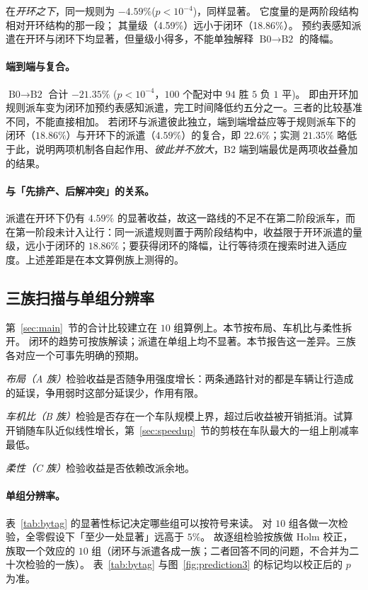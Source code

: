 \documentclass[manuscript,screen,review]{acmart}
\newcommand{\NCases}{10}
\newcommand{\NPairs}{100}
\newcommand{\GainLoopRule}{18.86\%}      %
\newcommand{\GainProbeOpen}{4.59\%}      %
\newcommand{\PProbeOpen}{<10^{-4}}
\newcommand{\GainEndToEnd}{21.35\%}      %
\newcommand{\PEndToEnd}{<10^{-4}}
\newcommand{\WinEndToEnd}{94}
\newcommand{\LoseEndToEnd}{5}
\newcommand{\GainIndepProduct}{22.6\%}
\begin{document}
在\emph{开环之下}，同一规则为 $-\GainProbeOpen$($p\PProbeOpen$)，同样显著。
它度量的是两阶段结构相对开环结构的那一段；
其量级（\GainProbeOpen{}）远小于闭环（\GainLoopRule{}）。
预约表感知派遣在开环与闭环下均显著，但量级小得多，不能单独解释 $\text{B0}\to\text{B2}$ 的降幅。

\paragraph{端到端与复合。}
\label{sec:complement}
$\text{B0}\to\text{B2}$ 合计 $-\GainEndToEnd$
($p\PEndToEnd$，$\NPairs$ 个配对中 $\WinEndToEnd$ 胜 $\LoseEndToEnd$ 负 $1$ 平)。
即由开环加规则派车变为闭环加预约表感知派遣，完工时间降低约五分之一。三者的比较基准不同，不能直接相加。
若闭环与派遣彼此独立，端到端增益应等于规则派车下的闭环（$\GainLoopRule$）与开环下的派遣（$\GainProbeOpen$）的复合，即 $\GainIndepProduct$；实测 $\GainEndToEnd$ 略低于此，说明两项机制各自起作用、\emph{彼此并不放大}，B2 端到端最优是两项收益叠加的结果。

\paragraph{与「先排产、后解冲突」的关系。}
派遣在开环下仍有 $\GainProbeOpen$ 的显著收益，故这一路线的不足不在第二阶段派车，而在第一阶段未计入让行：同一派遣规则置于两阶段结构中，收益限于开环派遣的量级，远小于闭环的 $\GainLoopRule$；要获得闭环的降幅，让行等待须在搜索时进入适应度。上述差距是在本文算例族上测得的。

\subsection{三族扫描与单组分辨率}
\label{sec:whichcongestion}

第~\ref{sec:main}~节的合计比较建立在 $\NCases$ 组算例上。本节按布局、车机比与柔性拆开。
闭环的趋势可按族解读；派遣在单组上均不显著。本节报告这一差异。三族各对应一个可事先明确的预期。

\emph{布局（A 族）}检验收益是否随争用强度增长：两条通路针对的都是车辆让行造成的延误，争用弱时这部分延误少，作用有限。

\emph{车机比（B 族）}检验是否存在一个车队规模上界，超过后收益被开销抵消。试算开销随车队近似线性增长，第~\ref{sec:speedup}~节的剪枝在车队最大的一组上削减率最低。

\emph{柔性（C 族）}检验收益是否依赖改派余地。

\paragraph{单组分辨率。}
表~\ref{tab:bytag} 的显著性标记决定哪些组可以按符号来读。
对 $\NCases$ 组各做一次检验，全零假设下「至少一处显著」远高于 $5\%$。
故逐组检验按族做 Holm 校正，族取一个效应的 $\NCases$ 组（闭环与派遣各成一族；二者回答不同的问题，不合并为二十次检验的一族）。
表~\ref{tab:bytag} 与图~\ref{fig:prediction3} 的标记均以校正后的 $p$ 为准。
\end{document}
